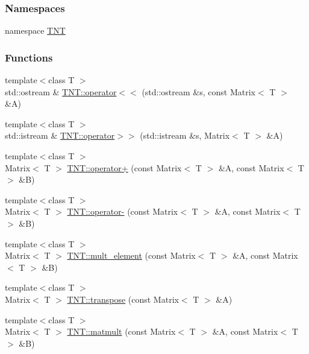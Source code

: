 \subsubsection*{Namespaces}
\begin{DoxyCompactItemize}
\item 
namespace \hyperlink{namespace_t_n_t}{TNT}
\end{DoxyCompactItemize}
\subsubsection*{Functions}
\begin{DoxyCompactItemize}
\item 
{\footnotesize template$<$class T $>$ }\\std::ostream \& \hyperlink{namespace_t_n_t_adeecd24f6af848eafc643c71ea35ea7f}{TNT::operator$<$$<$} (std::ostream \&s, const Matrix$<$ T $>$ \&A)
\item 
{\footnotesize template$<$class T $>$ }\\std::istream \& \hyperlink{namespace_t_n_t_ab9878fdc8dd7301c74dde5cf367f07bf}{TNT::operator$>$$>$} (std::istream \&s, Matrix$<$ T $>$ \&A)
\item 
{\footnotesize template$<$class T $>$ }\\Matrix$<$ T $>$ \hyperlink{namespace_t_n_t_a7652f9afa5f942b3484a18b332676ff8}{TNT::operator+} (const Matrix$<$ T $>$ \&A, const Matrix$<$ T $>$ \&B)
\item 
{\footnotesize template$<$class T $>$ }\\Matrix$<$ T $>$ \hyperlink{namespace_t_n_t_a05ffa4c326c0f51ef4e2c2be9abde552}{TNT::operator-\/} (const Matrix$<$ T $>$ \&A, const Matrix$<$ T $>$ \&B)
\item 
{\footnotesize template$<$class T $>$ }\\Matrix$<$ T $>$ \hyperlink{namespace_t_n_t_a39160bf84e65a9034369c1072456e83e}{TNT::mult\_\-element} (const Matrix$<$ T $>$ \&A, const Matrix$<$ T $>$ \&B)
\item 
{\footnotesize template$<$class T $>$ }\\Matrix$<$ T $>$ \hyperlink{namespace_t_n_t_aa97b646045595ba4d4a4b92fcc866cf8}{TNT::transpose} (const Matrix$<$ T $>$ \&A)
\item 
{\footnotesize template$<$class T $>$ }\\Matrix$<$ T $>$ \hyperlink{namespace_t_n_t_ad2ac1ae6c8d6dfdbdc22e63bc03700d7}{TNT::matmult} (const Matrix$<$ T $>$ \&A, const Matrix$<$ T $>$ \&B)
\item 

\end{DoxyCompactItemize}
